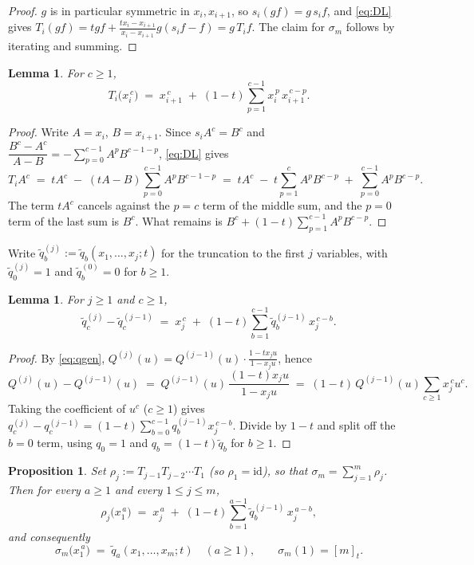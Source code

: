 \documentclass[11pt]{article}
\theoremstyle{plain}
\newtheorem{lemma}[theorem]{Lemma}
\newtheorem{proposition}[theorem]{Proposition}
\theoremstyle{definition}
\newcommand{\qt}[1]{[#1]_t}
\newcommand{\sm}{\sigma_m}
\newcommand{\qq}{\widetilde{q}}
\begin{document}
\begin{proof}
$g$ is in particular symmetric in $x_i,x_{i+1}$, so $s_i(gf)=g\,s_i f$, and \eqref{eq:DL} gives
$T_i(gf)=tgf+\frac{tx_i-x_{i+1}}{x_i-x_{i+1}}g(s_if-f)=g\,T_if$. The claim for $\sm$ follows by
iterating and summing.
\end{proof}

\begin{lemma}\label{lem:Tpower}
For $c\ge1$,
\[
  T_i\bigl(x_i^{\,c}\bigr) \;=\; x_{i+1}^{\,c} \;+\; (1-t)\sum_{p=1}^{c-1} x_i^{\,p}\,x_{i+1}^{\,c-p}.
\]
\end{lemma}

\begin{proof}
Write $A=x_i$, $B=x_{i+1}$. Since $s_iA^c=B^c$ and
$\dfrac{B^c-A^c}{A-B}=-\sum_{p=0}^{c-1}A^pB^{c-1-p}$, \eqref{eq:DL} gives
\[
  T_i A^c \;=\; tA^c \;-\;(tA-B)\sum_{p=0}^{c-1}A^{p}B^{c-1-p}
   \;=\; tA^c \;-\;t\sum_{p=1}^{c}A^{p}B^{c-p}\;+\;\sum_{p=0}^{c-1}A^{p}B^{c-p}.
\]
The term $tA^c$ cancels against the $p=c$ term of the middle sum, and the $p=0$ term of the
last sum is $B^c$. What remains is $B^c+(1-t)\sum_{p=1}^{c-1}A^pB^{c-p}$.
\end{proof}

Write $\qq^{(j)}_b:=\qq_b(x_1,\dots,x_j;t)$ for the truncation to the first $j$ variables, with
$\qq^{(j)}_0=1$ and $\qq^{(0)}_b=0$ for $b\ge1$.

\begin{lemma}\label{lem:qrec}
For $j\ge1$ and $c\ge1$,
\[
  \qq^{(j)}_c - \qq^{(j-1)}_c \;=\; x_j^{\,c} \;+\; (1-t)\sum_{b=1}^{c-1}\qq^{(j-1)}_b\,x_j^{\,c-b}.
\]
\end{lemma}

\begin{proof}
By \eqref{eq:qgen}, $Q^{(j)}(u)=Q^{(j-1)}(u)\cdot\frac{1-tx_ju}{1-x_ju}$, hence
\[
  Q^{(j)}(u)-Q^{(j-1)}(u)\;=\;Q^{(j-1)}(u)\,\frac{(1-t)x_ju}{1-x_ju}
   \;=\;(1-t)\,Q^{(j-1)}(u)\sum_{c\ge1}x_j^{\,c}u^{c}.
\]
Taking the coefficient of $u^c$ ($c\ge1$) gives
$q^{(j)}_c-q^{(j-1)}_c=(1-t)\sum_{b=0}^{c-1}q^{(j-1)}_b x_j^{\,c-b}$. Divide by $1-t$ and split
off the $b=0$ term, using $q_0=1$ and $q_b=(1-t)\qq_b$ for $b\ge1$.
\end{proof}

\begin{proposition}\label{prop:sigmapower}
Set $\rho_j:=T_{j-1}T_{j-2}\cdots T_1$ (so $\rho_1=\mathrm{id}$), so that $\sm=\sum_{j=1}^{m}\rho_j$.
Then for every $a\ge1$ and every $1\le j\le m$,
\begin{equation}\label{eq:rho}
  \rho_j\bigl(x_1^{\,a}\bigr)\;=\;x_j^{\,a}\;+\;(1-t)\sum_{b=1}^{a-1}\qq^{(j-1)}_b\,x_j^{\,a-b},
\end{equation}
and consequently
\begin{equation}\label{eq:sigmapower}
  \sm\bigl(x_1^{\,a}\bigr)\;=\;\qq_a(x_1,\dots,x_m;t)\quad (a\ge1),
  \qquad \sm(1)=\qt{m}.
\end{equation}
\end{proposition}
\end{document}
